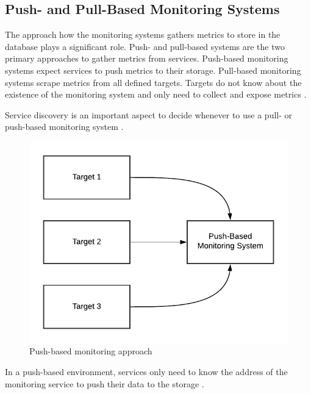 \subsection{Push- and Pull-Based Monitoring Systems}
\label{subsec:02_monitoring_push-pull}
The approach how the monitoring systems gathers metrics to store in the database plays a significant role.
Push- and pull-based systems are the two primary approaches to gather metrics from services.
Push-based monitoring systems expect services to push metrics to their storage.
Pull-based monitoring systems scrape metrics from all defined targets. Targets do not know about the existence of the monitoring system and only need to collect and expose metrics \cite{Farcic2017Toolkit21}.


Service discovery is an important aspect to decide whenever to use a pull- or push-based monitoring system \cite{Farcic2017Toolkit21}.

\begin{figure}[h]
\centering
\includegraphics[scale=0.8]{images/02_theoretical_foundation/monitoring/push_based}
\caption{Push-based monitoring approach}
\label{fig:mon_push-based}
\end{figure}
In a push-based environment, services only need to know the address of the monitoring service to push their data to the storage \cite{Farcic2017Toolkit21}.


